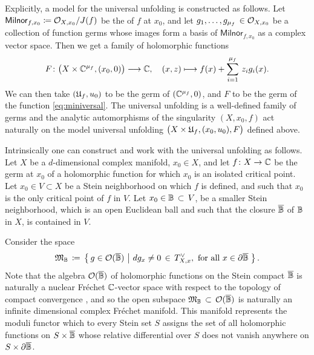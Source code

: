 \documentclass[twoside,leqno]{article}
\numberwithin{equation}{section}
\theoremstyle{plain}
\theoremstyle{definition}
\begin{document}
Explicitly, a model for the universal unfolding is constructed as follows. Let
$\mathsf{Milnor}_{f,x_{0}} \coloneqq \mathcal O_{X,x_{0}}/J(f)$ be the    of $f$ at $x_{0}$, and let 
$g_{1}, \ldots, g_{\mu_{f}} \, \in \mathcal O_{X,x_{0}}$ be a collection of function germs whose images form a basis of $\mathsf{Milnor}_{f,x_{0}}$ as a complex vector space. Then we get a family of holomorphic functions 
\begin{equation} \label{eq:miniversal}
F \colon \big(X\times \mathbb C^{\mu_{f}}, (x_{0},0)\big) \longrightarrow \mathbb C, \quad (x,z) \longmapsto 
f(x) + \sum_{i=1}^{\mu_{f}} \, z_{i}g_{i}(x).
\end{equation}
We can then take $(\mathfrak{U}_{f},u_{0})$ to be the germ of $(\mathbb C^{\mu_{f}},0)$, and $F$ to be the germ of the function \eqref{eq:miniversal}.  The universal unfolding is a well-defined family of germs and the analytic automorphisms of the singularity $(X,x_{0},f)$ act naturally on the  model universal unfolding $\big(X\times \mathfrak{U}_{f}, (x_{0},u_{0}),F\big)$ defined above. 

Intrinsically one can construct and work with the universal unfolding as follows. Let $X$ be a $d$-dimensional complex manifold, $x_{0} \in X$, and let $f \colon X \to \mathbb C$ be the germ at $x_{0}$ of a holomorphic function for which $x_{0}$ is an isolated critical point. Let $x_{0} \in V \subset X$ be a Stein neighborhood on which $f$ is defined, and such that $x_{0}$ is the only critical point of $f$ in $V$. Let $x_{0} \in \mathbb{B} \, \subset \, V$, be a smaller Stein neighborhood, which is an open Euclidean ball and such that the closure $\overline{\mathbb{B}}$ of $\mathbb{B}$ in $X$, is contained in $V$. 

Consider the space
\[
\mathfrak{M}_{\mathbb{B}} \, \coloneqq \, \left\{ \, g \in \mathcal O(\overline{\mathbb{B}}) \, \left| \ dg_{x} \neq 0 \, \in \, T_{X,x}^{\vee}, \ \text{for all} \ x \in \partial \overline{\mathbb{B}} \, \right.\right\}.
\]
Note that the algebra $\mathcal O(\overline{\mathbb{B}})$ of holomorphic functions on the Stein compact $\overline{\mathbb{B}}$ is naturally a nuclear Fr\'{e}chet $\mathbb C$-vector space with respect to the topology of compact convergence \cite[Chapter V.6.1]{GrauertRemmert_Stein}, and so the open subspace 
$\mathfrak{M}_{\mathbb{B}} \, \subset \, \mathcal O(\overline{\mathbb{B}})$ is naturally an infinite dimensional complex  
Fr\'{e}chet manifold. This manifold represents the moduli functor which to every Stein set $S$ assigns the set of all holomorphic functions on $S\times \overline{\mathbb{B}}$ whose relative differential over $S$ does not vanish anywhere on $S\times \partial\overline{\mathbb{B}}$. 
\end{document}
